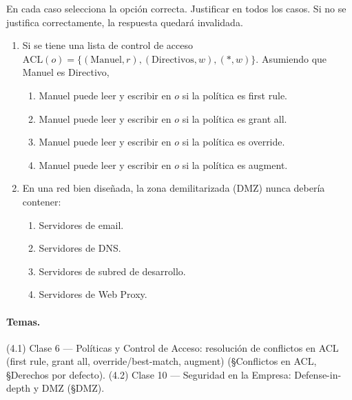 \begin{consigna}
En cada caso selecciona la opción correcta. Justificar en todos los casos. Si no se justifica correctamente, la respuesta quedará invalidada.
\begin{enumerate}
  \item Si se tiene una lista de control de acceso $\mathrm{ACL}(o) = \{(\text{Manuel}, r), (\text{Directivos}, w), (\ast, w)\}$. Asumiendo que Manuel es Directivo,
    \begin{enumerate}[label=\alph*.]
      \item Manuel puede leer y escribir en $o$ si la política es first rule.
      \item Manuel puede leer y escribir en $o$ si la política es grant all.
      \item Manuel puede leer y escribir en $o$ si la política es override.
      \item Manuel puede leer y escribir en $o$ si la política es augment.
    \end{enumerate}
  \item En una red bien diseñada, la zona demilitarizada (DMZ) nunca debería contener:
    \begin{enumerate}[label=\alph*.]
      \item Servidores de email.
      \item Servidores de DNS.
      \item Servidores de subred de desarrollo.
      \item Servidores de Web Proxy.
    \end{enumerate}
\end{enumerate}
\end{consigna}

\paragraph{Temas.} (4.1) Clase 6 — Políticas y Control de Acceso: resolución de conflictos en
ACL (first rule, grant all, override/best-match, augment) (\S Conflictos en ACL, \S Derechos
por defecto). (4.2) Clase 10 — Seguridad en la Empresa: Defense-in-depth y DMZ (\S DMZ).

